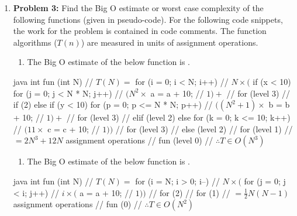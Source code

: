 \documentclass[12pt, a4paper]{article}
\begin{document}
\begin{enumerate}
	\item \textbf{Problem 3:} Find the Big O estimate or worst case complexity of the following functions (given in pseudo-code). \label{3}
		For the following code snippets, the work for the problem is contained in code comments.
		The function algorithms ($T(n)$) are measured in units of assignment operations.
		\begin{enumerate} %
		\item The Big O estimate of the below function is .
		\end{enumerate}\begin{mymintedunbreakablecodeblock}{java}
			int fun (int N) {                   // $T(N) =$
			  for (i = 0; i < N; i++) {         // $N \times ($
			    if (x < 10) {
			      for (j = 0; j < N * N; j++) { // $(N^2 \times$
			        a = a + 10;                 // $1) +$
			      } // for (level 3)
			    } // if (2)
			    else if (y < 10) {
			      for (p = 0; p <= N * N; p++) {// $((N^2 + 1)\times$
			        b = b + 10;                 // $1) +$
			      } // for (level 3)
			    } // elif (level 2)
			    else {
			      for (k = 0; k <= 10; k++) {   // $(11\times$
			        c = c + 10;                 // $1))$
			      } // for (level 3)
			    } // else (level 2)
			  } // for (level 1)
			    // $= 2N^3 + 12N$ assignment operations
			} // fun (level 0)                  // $\therefore T \in O(N^3)$\end{mymintedunbreakablecodeblock}
			\label{3(a)} %
		
		\begin{enumerate}[resume]
		\item The Big O estimate of the below function is .
		\end{enumerate}\begin{mymintedunbreakablecodeblock}{java}
			int fun (int N) {                   // $T(N) =$
			  for (i = N; i > 0; i--) {         // $N\times ($
			    for (j = 0; j < i; j++) {       // $i\times ($
			      a = a + 10;                   // $1))$
			    } // for (2)
			  } // for (1)
			    // $= \frac{1}{2}N(N - 1)$ assignment operations
			} // fun (0)                        // $\therefore T \in O(N^2)$\end{mymintedunbreakablecodeblock}
			\label{3(b)} %


\end{enumerate}
\end{document}
